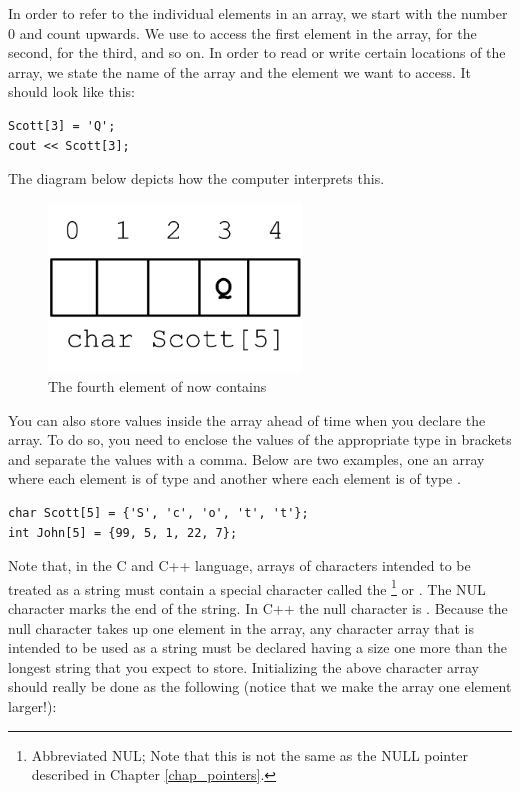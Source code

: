 In order to refer to the individual elements in an array, we start with the number 0 and count upwards. 
We use \Code{[0]} to access the first element in the array, \Code{[1]} for the second, \Code{[2]} for the third, and so on. 
In order to read or write certain locations of the array, we state the name of the array and the element we want to access. 
It should look like this:

\noindent\begin{minipage}{\linewidth}\begin{lstlisting}
Scott[3] = 'Q';
cout << Scott[3];
\end{lstlisting}\end{minipage}

The diagram below depicts how the computer interprets this. \nopagebreak[4]

\begin{figure}[tbh]
  \centering
  \includegraphics[width=0.6\textwidth]{diagrams/array-diagram-2.pdf}
  \caption{The fourth element of  now contains } \label{fig:array-diagram-2}
\end{figure}


You can also store values inside the array ahead of time when you declare the array. 
To do so, you need to enclose the values of the appropriate type in brackets and separate the values with a comma. 
Below are two examples, one an array where each element is of type  and another where each element is of type .

\noindent\begin{minipage}{\linewidth}\begin{lstlisting}
char Scott[5] = {'S', 'c', 'o', 't', 't'};	
int John[5] = {99, 5, 1, 22, 7};
\end{lstlisting}\end{minipage}
	
Note that, in the C and C++ language, arrays of characters intended to be treated as a string must contain a special character called the \footnote{Abbreviated NUL; Note that this is not the same as the NULL pointer described in Chapter \ref{chap_pointers}.} or . 
The NUL character marks the end of the string. 
In C++ the null character is . 
Because the null character takes up one element in the array, any character array that is intended to be used as a string must be declared having a size one more than the longest string that you expect to store. 
Initializing the above character array should really be done as the following (notice that we make the array one element larger!):

